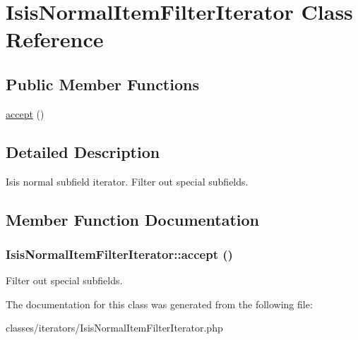 \hypertarget{classIsisNormalItemFilterIterator}{
\section{IsisNormalItemFilterIterator Class Reference}
\label{classIsisNormalItemFilterIterator}
}
\subsection*{Public Member Functions}
\begin{DoxyCompactItemize}
\item 
\hyperlink{classIsisNormalItemFilterIterator_ad3ef2ecdafb6a163a01b199a7e98cd6f}{accept} ()
\end{DoxyCompactItemize}


\subsection{Detailed Description}
Isis normal subfield iterator. Filter out special subfields. 

\subsection{Member Function Documentation}
\hypertarget{classIsisNormalItemFilterIterator_ad3ef2ecdafb6a163a01b199a7e98cd6f}{
\subsubsection[{accept}]{\setlength{\rightskip}{0pt plus 5cm}IsisNormalItemFilterIterator::accept ()}}
\label{classIsisNormalItemFilterIterator_ad3ef2ecdafb6a163a01b199a7e98cd6f}
Filter out special subfields. 

The documentation for this class was generated from the following file:\begin{DoxyCompactItemize}
\item 
classes/iterators/IsisNormalItemFilterIterator.php\end{DoxyCompactItemize}
